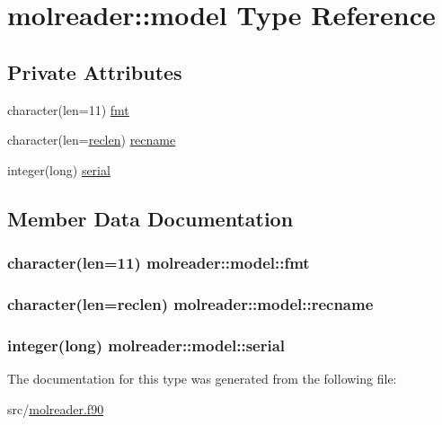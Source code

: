 \hypertarget{structmolreader_1_1model}{\section{molreader\+:\+:model Type Reference}
\label{structmolreader_1_1model}
}
\subsection*{Private Attributes}
\begin{DoxyCompactItemize}
\item 
character(len=11) \hyperlink{structmolreader_1_1model_a23b8930632b27e87549d8b297f827fd6}{fmt}
\item 
character(len=\hyperlink{classmolreader_a8f12be3272b946fd698c9fbaf2ba9d32}{reclen}) \hyperlink{structmolreader_1_1model_abac2ce11a9e639f8e2c4b29e40e87298}{recname}
\item 
integer(long) \hyperlink{structmolreader_1_1model_aff0c60ac8af22248ab65fa453bf87e6a}{serial}
\end{DoxyCompactItemize}


\subsection{Member Data Documentation}
\hypertarget{structmolreader_1_1model_a23b8930632b27e87549d8b297f827fd6}{
\subsubsection[{fmt}]{\setlength{\rightskip}{0pt plus 5cm}character(len=11) molreader\+::model\+::fmt\hspace{0.3cm}{\ttfamily [private]}}}\label{structmolreader_1_1model_a23b8930632b27e87549d8b297f827fd6}
\hypertarget{structmolreader_1_1model_abac2ce11a9e639f8e2c4b29e40e87298}{
\subsubsection[{recname}]{\setlength{\rightskip}{0pt plus 5cm}character(len={\bf reclen}) molreader\+::model\+::recname\hspace{0.3cm}{\ttfamily [private]}}}\label{structmolreader_1_1model_abac2ce11a9e639f8e2c4b29e40e87298}
\hypertarget{structmolreader_1_1model_aff0c60ac8af22248ab65fa453bf87e6a}{
\subsubsection[{serial}]{\setlength{\rightskip}{0pt plus 5cm}integer(long) molreader\+::model\+::serial\hspace{0.3cm}{\ttfamily [private]}}}\label{structmolreader_1_1model_aff0c60ac8af22248ab65fa453bf87e6a}


The documentation for this type was generated from the following file\+:\begin{DoxyCompactItemize}
\item 
src/\hyperlink{molreader_8f90}{molreader.\+f90}\end{DoxyCompactItemize}
